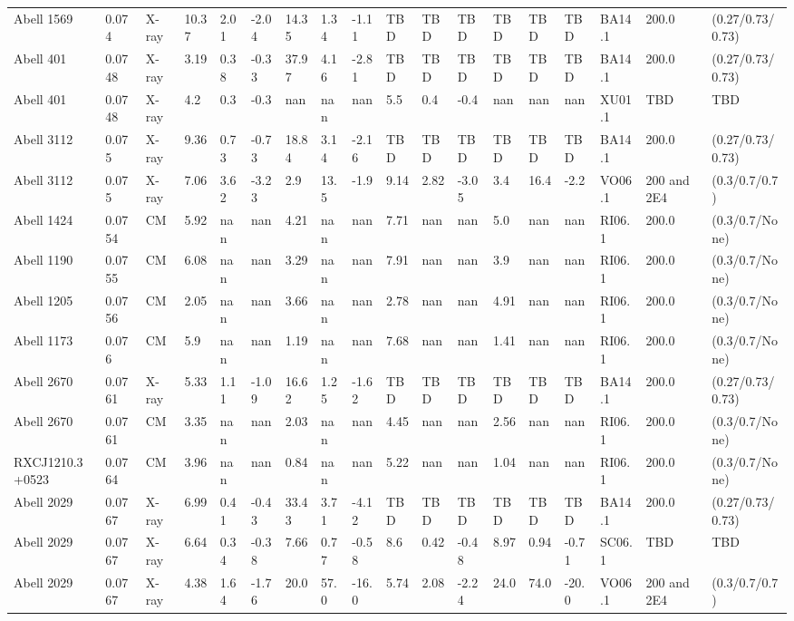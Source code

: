 \documentclass{article}
\begin{document}
\begin{center}
\begin{landscape}
\begin{longtable}{llllllllllllllllll}
Abell 1569 & 0.074 & X-ray & 10.37 & 2.01 & -2.04 & 14.35 & 1.34 & -1.11 & TBD & TBD & TBD & TBD & TBD & TBD & BA14.1 & 200.0 & (0.27/0.73/0.73) \\
Abell 401 & 0.0748 & X-ray & 3.19 & 0.38 & -0.33 & 37.97 & 4.16 & -2.81 & TBD & TBD & TBD & TBD & TBD & TBD & BA14.1 & 200.0 & (0.27/0.73/0.73) \\
Abell 401 & 0.0748 & X-ray & 4.2 & 0.3 & -0.3 & nan & nan & nan & 5.5 & 0.4 & -0.4 & nan & nan & nan & XU01.1 & TBD & TBD \\
Abell 3112 & 0.075 & X-ray & 9.36 & 0.73 & -0.73 & 18.84 & 3.14 & -2.16 & TBD & TBD & TBD & TBD & TBD & TBD & BA14.1 & 200.0 & (0.27/0.73/0.73) \\
Abell 3112 & 0.075 & X-ray & 7.06 & 3.62 & -3.23 & 2.9 & 13.5 & -1.9 & 9.14 & 2.82 & -3.05 & 3.4 & 16.4 & -2.2 & VO06.1 & 200 and 2E4 & (0.3/0.7/0.7) \\
Abell 1424 & 0.0754 & CM & 5.92 & nan & nan & 4.21 & nan & nan & 7.71 & nan & nan & 5.0 & nan & nan & RI06.1 & 200.0 & (0.3/0.7/None) \\
Abell 1190 & 0.0755 & CM & 6.08 & nan & nan & 3.29 & nan & nan & 7.91 & nan & nan & 3.9 & nan & nan & RI06.1 & 200.0 & (0.3/0.7/None) \\
Abell 1205 & 0.0756 & CM & 2.05 & nan & nan & 3.66 & nan & nan & 2.78 & nan & nan & 4.91 & nan & nan & RI06.1 & 200.0 & (0.3/0.7/None) \\
Abell 1173 & 0.076 & CM & 5.9 & nan & nan & 1.19 & nan & nan & 7.68 & nan & nan & 1.41 & nan & nan & RI06.1 & 200.0 & (0.3/0.7/None) \\
Abell 2670 & 0.0761 & X-ray & 5.33 & 1.11 & -1.09 & 16.62 & 1.25 & -1.62 & TBD & TBD & TBD & TBD & TBD & TBD & BA14.1 & 200.0 & (0.27/0.73/0.73) \\
Abell 2670 & 0.0761 & CM & 3.35 & nan & nan & 2.03 & nan & nan & 4.45 & nan & nan & 2.56 & nan & nan & RI06.1 & 200.0 & (0.3/0.7/None) \\
RXCJ1210.3+0523 & 0.0764 & CM & 3.96 & nan & nan & 0.84 & nan & nan & 5.22 & nan & nan & 1.04 & nan & nan & RI06.1 & 200.0 & (0.3/0.7/None) \\
Abell 2029 & 0.0767 & X-ray & 6.99 & 0.41 & -0.43 & 33.43 & 3.71 & -4.12 & TBD & TBD & TBD & TBD & TBD & TBD & BA14.1 & 200.0 & (0.27/0.73/0.73) \\
Abell 2029 & 0.0767 & X-ray & 6.64 & 0.34 & -0.38 & 7.66 & 0.77 & -0.58 & 8.6 & 0.42 & -0.48 & 8.97 & 0.94 & -0.71 & SC06.1 & TBD & TBD \\
Abell 2029 & 0.0767 & X-ray & 4.38 & 1.64 & -1.76 & 20.0 & 57.0 & -16.0 & 5.74 & 2.08 & -2.24 & 24.0 & 74.0 & -20.0 & VO06.1 & 200 and 2E4 & (0.3/0.7/0.7) \\

\end{longtable}
\end{landscape}
\end{center}
\end{document}
